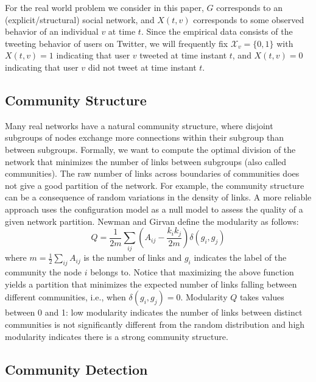 \documentclass[12pt]{article}
\begin{document}
For the real world problem we consider in this paper, $G$ corresponds to an (explicit/structural) social network, and $X(t,v)$ corresponds to some observed behavior of an individual $v$ at time $t$. Since the empirical data consists of the tweeting behavior of users on Twitter, we will frequently fix $\mathcal{X}_{v} = \{0, 1\}$ with $X(t, v) = 1$ indicating that user $v$ tweeted at time instant $t$, and $X(t, v) = 0$ indicating that user $v$ did not tweet at time instant $t$.

\subsection{Community Structure}

Many real networks have a natural community structure, where disjoint subgroups of nodes exchange more connections within their subgroup than between subgroups. Formally, we want to compute the optimal division of the network that minimizes the number of links between subgroups (also called  communities). The raw number of links across boundaries of communities does not give a good partition of the  network. For example, the community structure can be a consequence of random variations in the density of links. A more reliable approach uses the configuration model \cite{newman2001random} as a null model to assess the quality of a given network partition. Newman and Girvan \cite{newman2004finding} define the modularity as follows:
\begin{equation}
Q = \frac{1}{2m} \sum_{ij} \left( A_{ij} -
\frac{k_i k_j}{2m} \right) \delta(g_i,g_j)
\label{eq.q}
\end{equation}
where $m = \frac{1}{2} \sum_{ij} A_{ij}$ is the number of links and $g_i$
indicates the label of the community the node $i$
belongs to. Notice that maximizing the above function yields a partition that minimizes the 
expected number of links falling between different communities, i.e., when 
$\delta(g_i, g_j) = 0$. 
Modularity $Q$ takes values between 0 and 1: low modularity indicates the number of links 
between distinct communities is not significantly different from the random distribution and high 
modularity indicates there is a strong community structure.

\subsection{Community Detection}
\end{document}
